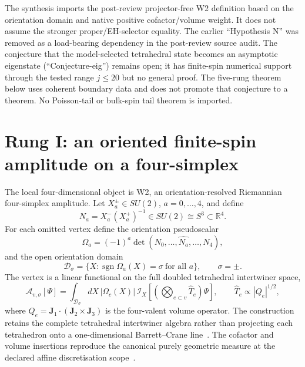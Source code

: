 \documentclass[11pt]{article}
\numberwithin{equation}{section}
\newcommand{\SUtwo}{SU(2)}
\newcommand{\Dom}{\mathcal D}
\begin{document}
The synthesis imports the post-review projector-free W2 definition based on the orientation domain and native positive cofactor/volume weight. It does not assume the stronger proper/EH-selector equality. The earlier ``Hypothesis N'' was removed as a load-bearing dependency in the post-review source audit. The conjecture that the model-selected tetrahedral state becomes an asymptotic eigenstate (``Conjecture-eig'') remains open; it has finite-spin numerical support through the tested range $j\le20$ but no general proof. The five-rung theorem below uses coherent boundary data and does not promote that conjecture to a theorem. No Poisson-tail or bulk-spin tail theorem is imported.

\section{Rung I: an oriented finite-spin amplitude on a four-simplex}\label{sec:r1}

The local four-dimensional object is W2, an orientation-resolved Riemannian four-simplex amplitude. Let $X_a^\pm\in\SUtwo$, $a=0,\dots,4$, and define
\begin{equation}
  N_a=X_a^-(X_a^+)^{-1}\in \SUtwo\cong S^3\subset\mathbb R^4.
\end{equation}
For each omitted vertex define the orientation pseudoscalar
\begin{equation}
  \Omega_a=(-1)^a\det(N_0,\ldots,\widehat{N_a},\ldots,N_4),
\end{equation}
and the open orientation domain
\begin{equation}
  \Dom_\sigma=\{X:\operatorname{sgn}\Omega_a(X)=\sigma\ \text{for all }a\},
  \qquad \sigma=\pm.
\end{equation}
The vertex is a linear functional on the full doubled tetrahedral intertwiner space,
\begin{equation}\label{eq:w2vertex}
  \mathcal A_{v,\sigma}[\Psi]
  =\int_{\Dom_\sigma}dX\,|\Omega_c(X)|\,
  \mathcal I_X\!\left[\left(\bigotimes_{e\subset v}\widehat T_e\right)\Psi\right],
  \qquad
  \widehat T_e\propto |Q_e|^{1/2},
\end{equation}
where $Q_e=\mathbf J_1\cdot(\mathbf J_2\times\mathbf J_3)$ is the four-valent volume operator. The construction retains the complete tetrahedral intertwiner algebra rather than projecting each tetrahedron onto a one-dimensional Barrett--Crane line~\cite{W2vertex}. The cofactor and volume insertions reproduce the canonical purely geometric measure at the declared affine discretisation scope~\cite{ShiraziEngle2014,W2vertex}.
\end{document}
